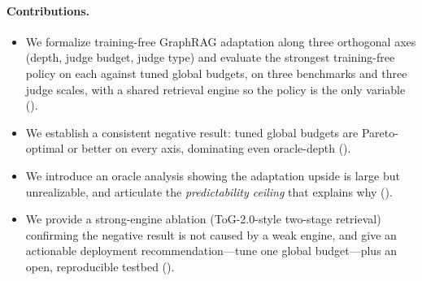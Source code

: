 \paragraph{Contributions.}
\begin{itemize}[leftmargin=*,nosep]
  \item We formalize training-free GraphRAG adaptation along three orthogonal axes (depth, judge budget, judge type) and evaluate the strongest training-free policy on each against tuned global budgets, on three benchmarks and three judge scales, with a shared retrieval engine so the policy is the only variable ().
  \item We establish a consistent negative result: tuned global budgets are Pareto-optimal or better on every axis, dominating even oracle-depth ().
  \item We introduce an oracle analysis showing the adaptation upside is large but unrealizable, and articulate the \emph{predictability ceiling} that explains why ().
  \item We provide a strong-engine ablation (ToG-2.0-style two-stage retrieval) confirming the negative result is not caused by a weak engine, and give an actionable deployment recommendation---tune one global budget---plus an open, reproducible testbed ().
\end{itemize}
